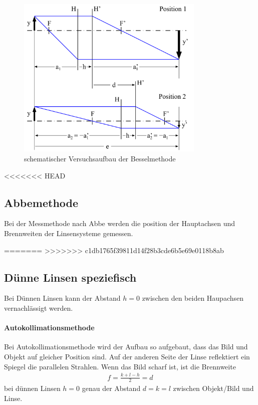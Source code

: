 \documentclass[11pt, a4paper]{article}
\begin{document}
    \begin{figure}
        \centering
        \includegraphics[width=0.8\textwidth]{Bessel_Abb.png}
        \caption{schematischer Versuchsaufbau der Besselmethode \cite{OPA}}   %
        \label{fig:BesselAbb}
    \end{figure}

<<<<<<< HEAD
    \subsection{Abbemethode}

    Bei der Messmethode nach Abbe werden die position der Hauptachsen und Brennweiten der Linsensysteme gemessen. 

=======
>>>>>>> c1db1765f39811d14f28b3cde6b5e69e0118b8ab
    \subsection{Dünne Linsen speziefisch}
    Bei Dünnen Linsen kann der Abstand $h = 0$ zwischen den beiden Haupachsen vernachlässigt werden.
    
    \paragraph{Autokollimationsmethode}
    Bei Autokollimationsmethode wird der Aufbau so aufgebaut, dass das Bild und Objekt auf gleicher Position sind. Auf der anderen Seite der Linse reflektiert ein Spiegel die parallelen Strahlen. Wenn das Bild scharf ist, ist die Brennweite
    \begin{align}
        f = \frac{k + l - h}{2}  = d \label{eq:auto}
    \end{align}
    bei dünnen Linsen $h=0$ genau der Abstand $d = k = l$ zwischen Objekt/Bild und Linse.
\end{document}
